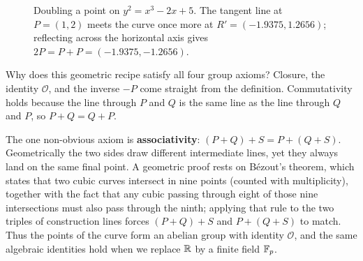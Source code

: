 \begin{figure}[htbp]
\centering
{}
\caption{Doubling a point on $y^2 = x^3 - 2x + 5$. The tangent line at $P=(1,2)$ meets
the curve once more at $R'=(-1.9375, 1.2656)$; reflecting across the horizontal axis gives
$2P = P+P = (-1.9375, -1.2656)$.}
\label{ch21:doubling-fig}
\end{figure}

\begin{whybox}
Why does this geometric recipe satisfy all four group axioms? Closure, the identity
$\mathcal{O}$, and the inverse $-P$ come straight from the definition. Commutativity holds
because the line through $P$ and $Q$ is the same line as the line through $Q$ and $P$, so
$P+Q=Q+P$.

The one non-obvious axiom is \textbf{associativity}: $(P+Q)+S = P+(Q+S)$. Geometrically
the two sides draw different intermediate lines, yet they always land on the same final
point. A geometric proof rests on B\'ezout's theorem, which states that two cubic curves
intersect in nine points (counted with multiplicity), together with the fact that any
cubic passing through eight of those nine intersections must also pass through the ninth;
applying that rule to the two triples of construction lines forces $(P+Q)+S$ and $P+(Q+S)$
to match. Thus the points of the curve form an abelian group with identity $\mathcal{O}$,
and the same algebraic identities hold when we replace $\mathbb{R}$ by a finite field $\mathbb{F}_p$.
\end{whybox}

